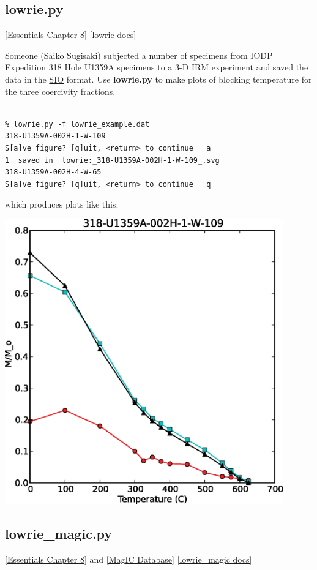 \documentclass[11pt]{book}
\begin{document}
{{
\subsection{lowrie.py}
\href{http://earthref.org/MAGIC/books/Tauxe/Essentials/WebBook3ch8.html#lowrie}{[Essentials Chapter 8]}
\href{https://github.com/PmagPy/PmagPy/blob/master/programs/lowrie.py}{[lowrie docs]}

Someone (Saiko Sugisaki) subjected a number of specimens from IODP Expedition 318 Hole U1359A specimens to a 3-D IRM experiment and saved the data in the \href{#sio_magic.py}{SIO} format.
Use {\bf lowrie.py} to make plots of blocking temperature for the three  coercivity fractions.

\begin{verbatim}

% lowrie.py -f lowrie_example.dat
318-U1359A-002H-1-W-109
S[a]ve figure? [q]uit, <return> to continue   a
1  saved in  lowrie:_318-U1359A-002H-1-W-109_.svg
318-U1359A-002H-4-W-65
S[a]ve figure? [q]uit, <return> to continue   q
\end{verbatim}

which produces plots like this:

\includegraphics[width=12cm]{EPSfiles/lowrie.eps}

\subsection{lowrie\_magic.py}
\href{http://earthref.org/MAGIC/books/Tauxe/Essentials/WebBook3ch8.html#lowrie}{[Essentials Chapter 8]} and \href{#MagICDatabase}{[MagIC Database]}
\href{https://github.com/PmagPy/PmagPy/blob/master/programs/lowrie_magic.py}{[lowrie\_magic docs]}

}}
\end{document}
